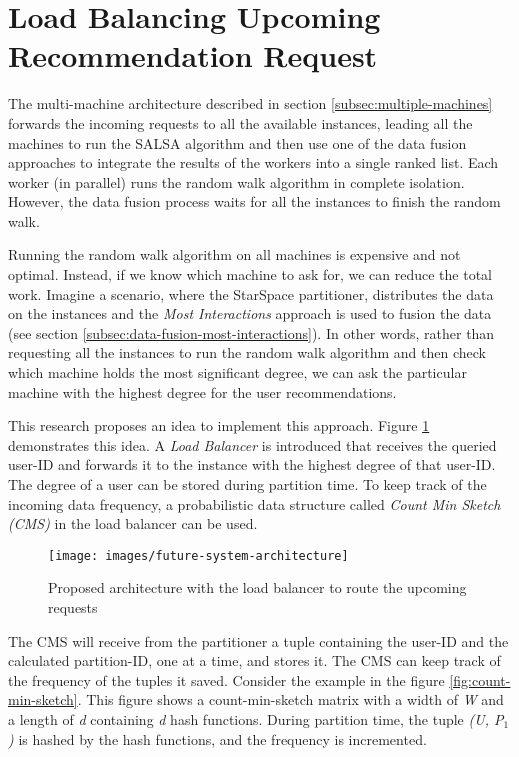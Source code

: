 \section{Load Balancing Upcoming Recommendation Request}
\label{sec:load-balancing}
The multi-machine architecture described in section \ref{subsec:multiple-machines} forwards the incoming requests to all the available instances, leading all the machines to run the SALSA algorithm and then use one of the data fusion approaches to integrate the results of the workers into a single ranked list. Each worker (in parallel) runs the random walk algorithm in complete isolation. However, the data fusion process waits for all the instances to finish the random walk. 


Running the random walk algorithm on all machines is expensive and not optimal. Instead, if we know which machine to ask for, we can reduce the total work. Imagine a scenario, where the StarSpace partitioner, distributes the data on the instances and the \emph{Most Interactions} approach is used to fusion the data (see section \ref{subsec:data-fusion-most-interactions}). In other words, rather than requesting all the instances to run the random walk algorithm and then check which machine holds the most significant degree, we can ask the particular machine with the highest degree for the user recommendations.

This research proposes an idea to implement this approach. Figure \ref{fig:loadbalancer} demonstrates this idea. A \emph{Load Balancer} is introduced that receives the queried user-ID and forwards it to the instance with the highest degree of that user-ID. The degree of a user can be stored during partition time. To keep track of the incoming data frequency, a probabilistic data structure called \emph{Count Min Sketch (CMS)} \cite{cormodeImprovedDataStream2005} in the load balancer can be used.


\begin{figure}[!ht]
    \centering
    \texttt{[image: images/future-system-architecture]}
    \caption{Proposed architecture with the load balancer to route the upcoming requests}
    \label{fig:loadbalancer}
\end{figure}


The CMS will receive from the partitioner a tuple containing the user-ID and the calculated partition-ID, one at a time, and stores it. The CMS can keep track of the frequency of the tuples it saved. Consider the example in the figure \ref{fig:count-min-sketch}. This figure shows a count-min-sketch matrix with a width of \emph{W} and a length of \emph{d} containing \emph{d} hash functions. During partition time, the tuple \emph{(\emph{U}, \emph{P$_1$})} is hashed by the hash functions, and the frequency is incremented.

